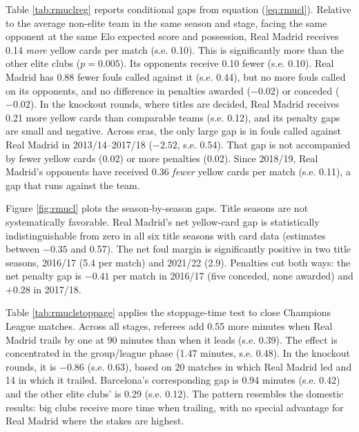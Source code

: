 Table \ref{tab:rmuclreg} reports conditional gaps from equation (\ref{eq:rmucl}). Relative to the average non-elite team in the same season and stage, facing the same opponent at the same Elo expected score and possession, Real Madrid receives 0.14 \emph{more} yellow cards per match (s.e. 0.10). This is significantly more than the other elite clubs ($p = 0.005$). Its opponents receive 0.10 fewer (s.e. 0.10). Real Madrid has 0.88 fewer fouls called against it (s.e. 0.44), but no more fouls called on its opponents, and no difference in penalties awarded ($-0.02$) or conceded ($-0.02$). In the knockout rounds, where titles are decided, Real Madrid receives 0.21 more yellow cards than comparable teams (s.e. 0.12), and its penalty gaps are small and negative. Across eras, the only large gap is in fouls called against Real Madrid in 2013/14--2017/18 ($-2.52$, s.e. 0.54). That gap is not accompanied by fewer yellow cards (0.02) or more penalties (0.02). Since 2018/19, Real Madrid's opponents have received 0.36 \emph{fewer} yellow cards per match (s.e. 0.11), a gap that runs against the team.

Figure \ref{fig:rmucl} plots the season-by-season gaps. Title seasons are not systematically favorable. Real Madrid's net yellow-card gap is statistically indistinguishable from zero in all six title seasons with card data (estimates between $-0.35$ and 0.57). The net foul margin is significantly positive in two title seasons, 2016/17 (5.4 per match) and 2021/22 (2.9). Penalties cut both ways: the net penalty gap is $-0.41$ per match in 2016/17 (five conceded, none awarded) and $+0.28$ in 2017/18.

Table \ref{tab:rmuclstoppage} applies the stoppage-time test to close Champions League matches. Across all stages, referees add 0.55 more minutes when Real Madrid trails by one at 90 minutes than when it leads (s.e. 0.39). The effect is concentrated in the group/league phase (1.47 minutes, s.e. 0.48). In the knockout rounds, it is $-0.86$ (s.e. 0.63), based on 20 matches in which Real Madrid led and 14 in which it trailed. Barcelona's corresponding gap is 0.94 minutes (s.e. 0.42) and the other elite clubs' is 0.29 (s.e. 0.12). The pattern resembles the domestic results: big clubs receive more time when trailing, with no special advantage for Real Madrid where the stakes are highest.
